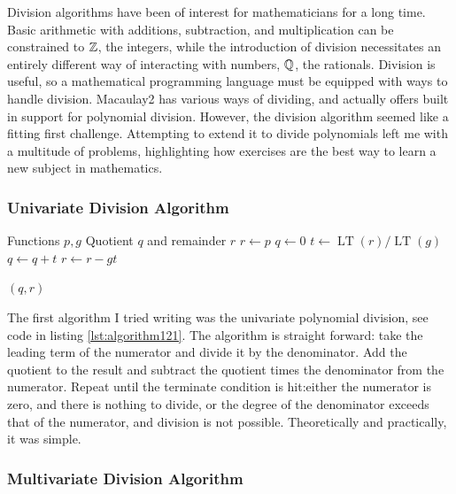 Division algorithms have been of interest for mathematicians for a long time. Basic arithmetic with additions, subtraction, and multiplication can be constrained to $\mathbb{Z}$, the integers, while the introduction of division necessitates an entirely different way of interacting with numbers, $\mathbb{Q}$, the rationals. Division is useful, so a mathematical programming language must be equipped with ways to handle division. Macaulay2 has various ways of dividing, and actually offers built in support for polynomial division. However, the division algorithm seemed like a fitting first challenge. Attempting to extend it to divide polynomials left me with a multitude of problems, highlighting how exercises are the best way to learn a new subject in mathematics. 

\subsubsection{Univariate Division Algorithm}
\label{sssec:univariate-division-algorithm}
\begin{algorithm}[ht]
\caption{Univariate Division Algorithm}
\begin{algorithmic}[1]
\Require Functions $p,g$
\Ensure Quotient $q$ and remainder $r$
\State $r \gets p$ 
\State $q \gets 0$
    \State $t \gets \operatorname{LT}(r) / \operatorname{LT}(g)$
    \State $q \gets q+t$
    \State $r \gets r - g t$
\EndWhile

\State \Return $ (q,r)$
\end{algorithmic}
\end{algorithm}

The first algorithm I tried writing was the univariate polynomial division, see code in listing \ref{lst:algorithm121}. The algorithm is straight forward: take the leading term of the numerator and divide it by the denominator. Add the quotient to the result and subtract the quotient times the denominator from the numerator. Repeat until the terminate condition is hit:either the numerator is zero, and there is nothing to divide, or the degree of the denominator exceeds that of the numerator, and division is not possible. Theoretically and practically, it was simple.

\subsubsection{Multivariate Division Algorithm}
\label{sssec:multivariate-division-algorithm}


